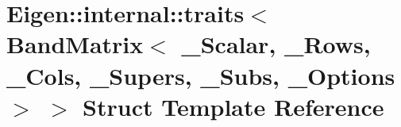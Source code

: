 \hypertarget{struct_eigen_1_1internal_1_1traits_3_01_band_matrix_3_01___scalar_00_01___rows_00_01___cols_00_03762db5085b3b9896d5a124beda4837b}{}\section{Eigen\+:\+:internal\+:\+:traits$<$ Band\+Matrix$<$ \+\_\+\+Scalar, \+\_\+\+Rows, \+\_\+\+Cols, \+\_\+\+Supers, \+\_\+\+Subs, \+\_\+\+Options $>$ $>$ Struct Template Reference}
\label{struct_eigen_1_1internal_1_1traits_3_01_band_matrix_3_01___scalar_00_01___rows_00_01___cols_00_03762db5085b3b9896d5a124beda4837b}
